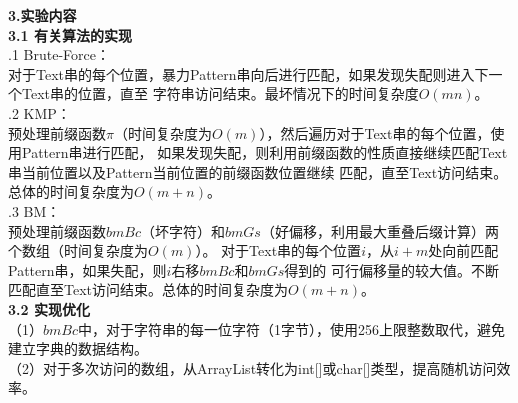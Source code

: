 \documentclass[a4paper]{article}
\begin{document}
\begin{enumerate}
  \textbf{3.实验内容}\\
  \textbf{3.1 有关算法的实现}\\
  .1 Brute-Force：\\
  对于Text串的每个位置，暴力Pattern串向后进行匹配，如果发现失配则进入下一个Text串的位置，直至
  字符串访问结束。最坏情况下的时间复杂度$O(mn)$。\\
  .2 KMP：\\
  预处理前缀函数$\pi$（时间复杂度为$O(m)$），然后遍历对于Text串的每个位置，使用Pattern串进行匹配，
  如果发现失配，则利用前缀函数的性质直接继续匹配Text串当前位置以及Pattern当前位置的前缀函数位置继续
  匹配，直至Text访问结束。总体的时间复杂度为$O(m+n)$。\\
  .3 BM：\\
  预处理前缀函数$bmBc$（坏字符）和$bmGs$（好偏移，利用最大重叠后缀计算）两个数组（时间复杂度为$O(m)$）。
  对于Text串的每个位置$i$，从$i+m$处向前匹配Pattern串，如果失配，则$i$右移$bmBc$和$bmGs$得到的
  可行偏移量的较大值。不断匹配直至Text访问结束。总体的时间复杂度为$O(m+n)$。\\
  \medskip
  \textbf{3.2 实现优化}\\
  （1）$bmBc$中，对于字符串的每一位字符（1字节），使用256上限整数取代，避免建立字典的数据结构。\\
  （2）对于多次访问的数组，从ArrayList转化为int[]或char[]类型，提高随机访问效率。
  
  \medskip


\end{enumerate}
\end{document}
